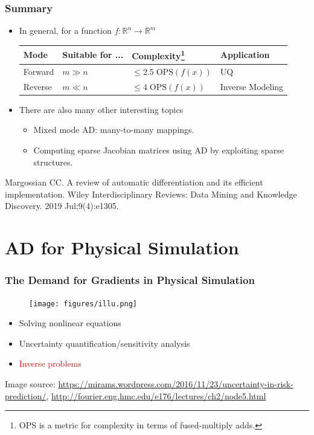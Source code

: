 \documentclass{beamer}
\newcommand{\red}[1]{\textcolor{red}{#1}}
\newcommand{\RR}[0]{\mathbb{R}}
\begin{document}
\begin{frame}
	\frametitle{Summary}
	
	\begin{itemize}
		\item In general, for a function $f:\RR^n \rightarrow \RR^m$
\begin{table}[]
\centering
\begin{tabular}{@{}llll@{}}
\toprule
Mode & Suitable for ... & Complexity\footnote{$\mathrm{OPS}$ is a metric for complexity in terms of fused-multiply adds.} & Application \\ \midrule
Forward & $m\gg n$ & $\leq 2.5\;\mathrm{OPS}(f(x))$ & UQ \\
Reverse & $m\ll n$ & $\leq 4\;\mathrm{OPS}(f(x))$ & Inverse Modeling \\ \bottomrule
\end{tabular}
\end{table}
	
		
		\item There are also many other interesting topics
		\begin{itemize}
		\item Mixed mode AD: many-to-many mappings.
		\item Computing sparse Jacobian matrices using AD by exploiting sparse structures. 
		\end{itemize}
	\end{itemize}
	{\scriptsize Margossian CC. A review of automatic differentiation and its efficient implementation. Wiley Interdisciplinary Reviews: Data Mining and Knowledge Discovery. 2019 Jul;9(4):e1305.} 
\end{frame}


\section{AD for Physical Simulation}

\begin{frame}
	\frametitle{The Demand for Gradients in Physical Simulation}
	
	\begin{figure}[hbt]
  \texttt{[image: figures/illu.png]}
\end{figure}

	\begin{itemize}
		\item Solving nonlinear equations
		\item Uncertainty quantification/sensitivity analysis
		\item \red{Inverse problems}
	\end{itemize}
	
	\scriptsize{Image source: \url{https://mirams.wordpress.com/2016/11/23/uncertainty-in-risk-prediction/}, \url{http://fourier.eng.hmc.edu/e176/lectures/ch2/node5.html}}
\end{frame}
\end{document}
